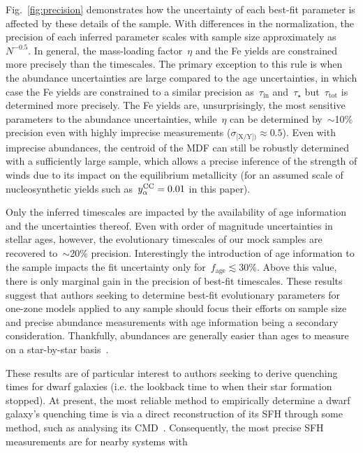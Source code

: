 \documentclass[ms.tex]{subfiles}
\begin{document}
Fig.~\ref{fig:precision} demonstrates how the uncertainty of each best-fit
parameter is affected by these details of the sample.
With differences in the normalization, the precision of each inferred parameter
scales with sample size approximately as~$N^{-0.5}$.
In general, the mass-loading factor~$\eta$ and the Fe yields are constrained
more precisely than the timescales.
The primary exception to this rule is when the abundance uncertainties are
large compared to the age uncertainties, in which case the Fe yields are
constrained to a similar precision as~$\tau_\text{in}$ and~$\tau_\star$
but~$\tau_\text{tot}$ is determined more precisely.
The Fe yields are, unsurprisingly, the most sensitive parameters to the
abundance uncertainties, while~$\eta$ can be determined by~$\sim$10\% precision
even with highly imprecise measurements ($\sigma_\text{[X/Y])} \approx 0.5$).
Even with imprecise abundances, the centroid of the MDF can still be robustly
determined with a sufficiently large sample, which allows a precise inference
of the strength of winds due to its impact on the equilibrium metallicity (for
an assumed scale of nucleosynthetic yields such as~$y_\alpha^\text{CC} = 0.01$ in this
paper).
\par
Only the inferred timescales are impacted by the availability of age
information and the uncertainties thereof.
Even with order of magnitude uncertainties in stellar ages, however, the
evolutionary timescales of our mock samples are recovered to~$\sim$20\%
precision.
Interestingly the introduction of age information to the sample impacts the
fit uncertainty only for~$f_\text{age} \lesssim 30$\%.
Above this value, there is only marginal gain in the precision of best-fit
timescales.
These results suggest that authors seeking to determine best-fit evolutionary
parameters for one-zone models applied to any sample should focus their efforts
on sample size and precise abundance measurements with age information being
a secondary consideration.
Thankfully, abundances are generally easier than ages to measure on a
star-by-star basis~\citep{Soderblom2010, Chaplin2013}.
\par
These results are of particular interest to authors seeking to derive quenching
times for dwarf galaxies (i.e. the lookback time to when their star formation
stopped).
At present, the most reliable method to empirically determine a dwarf galaxy's
quenching time is via a direct reconstruction of its SFH through some method,
such as analysing its CMD~\citep[e.g.][]{Sohn2013, Weisz2015}.
Consequently, the most precise SFH measurements are for nearby systems with
\end{document}
